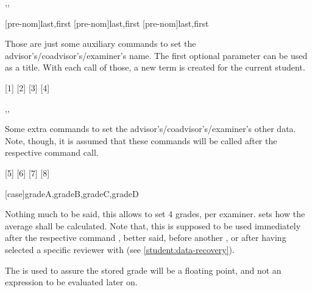 \documentclass[10pt]{article}
\begin{document}
\begin{codedescribe}{\advisor,\coadvisor,\examiner}
  \begin{codesyntax}
    \tsmacro{\advisor}[pre-nom]{last,first}
    \tsmacro{\coadvisor}[pre-nom]{last,first}
    \tsmacro{\examiner}[pre-nom]{last,first}
  \end{codesyntax}
  Those are just some auxiliary commands to set the advisor's/coadvisor's/examiner's name. The first optional parameter  can be used as a title. With each call of those, a new  term is created for the current student.
\end{codedescribe}

[1]
[2]
[3]
[4]

\begin{codedescribe}{\advisorinfo,\coadvisorinfo,\examinerinfo}
  \begin{codesyntax}
  \end{codesyntax}
  Some extra commands to set the advisor's/coadvisor's/examiner's other data. Note, though, it is assumed that these commands will be called after the respective \tsobj[code,sep=or]{\advisor,\coadvisor,\examiner} command call.
\end{codedescribe}

[5]
[6]
[7]
[8]


\begin{codedescribe}{\examinergrades}
\begin{codesyntax}
  \tsmacro{\examinergrades}[case]{gradeA,gradeB,gradeC,gradeD}
\end{codesyntax}  
Nothing much to be said, this allows to set 4 grades, per examiner.  sets how the average shall be calculated. Note that, this is supposed to be used immediately  after the respective command \tsobj{\examiner}, better said, before another \tsobj{\examiner}, or after having selected a specific reviewer with \tsobj{\studentreviewerselect} (see \ref{student:data-recovery}).
\begin{tsremark}
  The  is used to assure the stored grade will be a floating point, and not an expression to be evaluated later on.
\end{tsremark}
\end{codedescribe}
\end{document}

